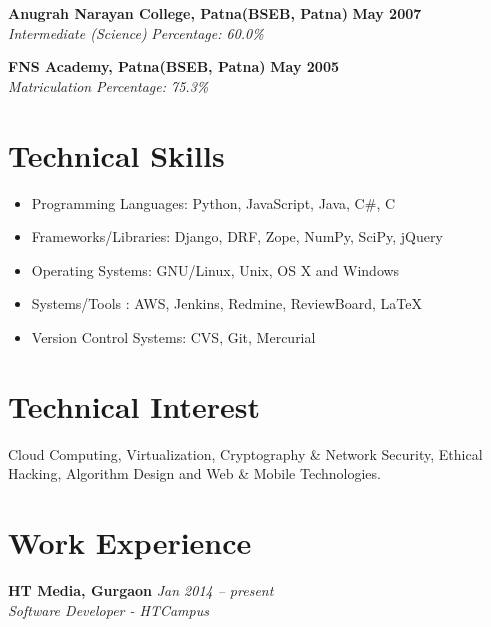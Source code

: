 \documentclass[margin,line]{resume}
\begin{document}
\begin{resume}
    \textbf{Anugrah Narayan College, Patna(BSEB, Patna)} \hfill \textbf{May 2007}\vspace{0mm}\\\vspace{0mm}%
    \textsl{Intermediate (Science)} \hfill \textsl{Percentage: 60.0\%}

    \textbf{FNS Academy, Patna(BSEB, Patna)} \hfill \textbf{May 2005}\vspace{0mm}\\\vspace{0mm}%
    \textsl{Matriculation } \hfill \textsl{Percentage: 75.3\%}
    \section{\mysidestyle Technical Skills}
     \begin{itemize}
      \item Programming Languages: Python, JavaScript, Java, C\#, C
      \item Frameworks/Libraries: Django, DRF, Zope, NumPy, SciPy, jQuery
      \item Operating Systems: GNU/Linux, Unix, OS X and Windows
      \item Systems/Tools : AWS, Jenkins, Redmine, ReviewBoard, \LaTeX
      \item Version Control Systems: CVS, Git, Mercurial      
     \end{itemize}
     \section{\mysidestyle Technical Interest}
        Cloud Computing, Virtualization, Cryptography \& Network Security, Ethical Hacking, Algorithm Design and Web \& Mobile Technologies.
    \section{\mysidestyle Work Experience}

    \textbf{HT Media, Gurgaon} \hfill \textsl{Jan 2014 -- present} \vspace{0mm}\\\vspace{0mm}%
           \textsl{Software Developer - HTCampus}\\
    \begin{itemize}
    

\end{itemize}
\end{resume}
\end{document}

